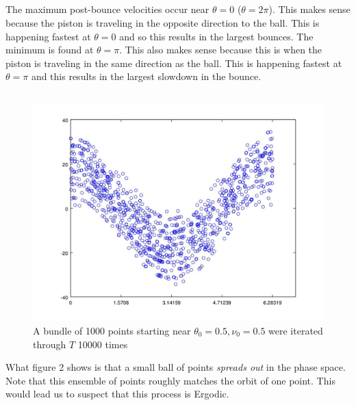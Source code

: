 \documentclass{unswmaths}
\begin{document}
\subsection{}
The maximum post-bounce velocities occur near $ \theta = 0 $ ($\theta = 2\pi$). This makes sense because the piston is traveling in the opposite direction to the ball. This is happening fastest at $ \theta = 0 $ and so this results in the largest bounces. The minimum is found at $ \theta = \pi $. This also makes sense because this is when the piston is traveling in the same direction as the ball. This is happening fastest at $ \theta = \pi $ and this results in the largest slowdown in the bounce.

\subsection{}
\subsection{}
\label{qn_6_ergodic}
\begin{figure}[h]
    \includegraphics[scale=0.5]{Question_6_Ergodic}
    \caption{A bundle of 1000 points starting near $ \theta_0 = 0.5,  \nu_0 = 0.5 $ were iterated through $  T $ 10000 times}
\end{figure}

What figure 2 shows is that a small ball of points \emph{spreads out} in the phase space. Note that this ensemble of points roughly matches the orbit of one point. This would lead us to suspect that this process is Ergodic. 
\end{document}
